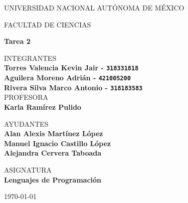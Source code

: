 \documentclass{article}
\begin{document}
	\begin{center}
	\vspace{0.8cm}
	\LARGE
	UNIVERSIDAD NACIONAL AUTÓNOMA DE MÉXICO 
	
	\vspace{0.7cm}
	\LARGE
	FACULTAD DE CIENCIAS
	
	\vspace{0.8 cm}	
	\Large
	\textbf{Tarea 2}

	\vspace{0.8 cm}
	\normalsize	
	INTEGRANTES \\
	\vspace{.2cm}
	\large
	\textbf{Torres Valencia Kevin Jair - \texttt{318331818}}\\
	\textbf{Aguilera Moreno Adrián - \texttt{421005200}}\\
	\textbf{Rivera Silva Marco Antonio - \texttt{318183583}}\\
	
	\vspace{1 cm}
	\normalsize	
	PROFESORA \\
	\vspace{.2cm}
	\large
	\textbf{Karla Ramírez Pulido}
	
	\vspace{1 cm}
	AYUDANTES \\
	\vspace{.2cm}
	\large
	\textbf{Alan Alexis Martínez López}\\
	\textbf{Manuel Ignacio Castillo López}\\
	\textbf{Alejandra Cervera Taboada}
	\vspace{1.3cm}
	
	\normalsize	
	ASIGNATURA \\
	\vspace{.2cm}
	\large
	\textbf{Lenguajes de Programación}
	
	\vspace{1 cm}
	\today
	\end{center}
	
	\newpage
	
        
        
        
	
        
        
        
        
	
	
	
\end{document}
